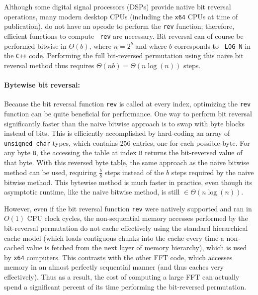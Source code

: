 \documentclass[10pt]{article}
\begin{document}
Although some digital signal processors (DSPs) provide native bit
reversal operations, many modern desktop CPUs (including the {\tt x64}
CPUs at time of publication), do not have an opcode to perform the
{\tt rev} function; therefore, efficient functions to compute {\tt
  rev} are necessary. Bit reversal can of course be performed bitwise
in $\Theta(b)$, where $n = 2^b$ and where $b$ corresponds to {\tt
  LOG\_N} in the {\tt C++} code. Performing the full bit-reversed
permutation using this naive bit reversal method thus requires
$\Theta(n b) = \Theta(n \log(n))$ steps.

\paragraph{Bytewise bit reversal:}
Because the bit reversal function {\tt rev} is called at every index,
optimizing the {\tt rev} function can be quite beneficial for
performance. One way to perform bit reversal significantly faster than
the naive bitwise approach is to swap with byte blocks instead of
bits. This is efficiently accomplished by hard-coding an array of {\tt
  unsigned char} types, which contains 256 entries, one for each
possible byte. For any byte {\tt B}, the accessing the table at index
{\tt B} returns the bit-reversed value of that byte\cite{j:best,
  anderson:bit}. With this reversed byte table, the same approach as
the naive bitwise method can be used, requiring $\frac{b}{8}$ steps
instead of the $b$ steps required by the naive bitwise method. This
bytewise method is much faster in practice, even though its asymptotic
runtime, like the naive bitwise method, is still $\in \Theta(n
\log(n))$.

However, even if the bit reversal function {\tt rev} were natively
supported and ran in $O(1)$ CPU clock cycles, the non-sequential
memory accesses performed by the bit-reversal permutation do not cache
effectively using the standard hierarchical cache model (which loads
contiguous chunks into the cache every time a non-cached value is
fetched from the next layer of memory hierarchy), which is used by
{\tt x64} computers. This contrasts with the other FFT code, which
accesses memory in an almost perfectly sequential manner (and thus
caches very effectively). Thus as a result, the cost of computing a
large FFT can actually spend a significant percent of its time
performing the bit-reversed permutation.

\end{document}
